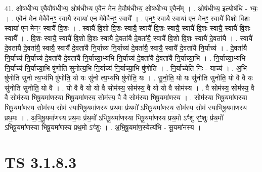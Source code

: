 \documentclass[17pt]{extarticle}
\begin{document}
41. ओष॑धीभ्य ए॒वैवौष॑धीभ्य॒ ओष॑धीभ्य ए॒वैन॑ मेन मे॒वौष॑धीभ्य॒ ओष॑धीभ्य ए॒वैन᳚म् । . ओष॑धीभ्य॒ इत्योष॑धि - भ्यः॒ । . ए॒वैन॑ मेन मे॒वैवैनꣳ॒॒ स्वायै॒ स्वाया॑ एन मे॒वैवैनꣳ॒॒ स्वायै᳚ । . ए॒नꣳ॒॒ स्वायै॒ स्वाया॑ एन मेनꣳ॒॒ स्वायै॑ वि॒शो वि॒शः स्वाया॑ एन मेनꣳ॒॒ स्वायै॑ वि॒शः । . स्वायै॑ वि॒शो वि॒शः स्वायै॒ स्वायै॑ वि॒शः स्वायै॒ स्वायै॑ वि॒शः स्वायै॒ स्वायै॑ वि॒शः स्वायै᳚ । . वि॒शः स्वायै॒ स्वायै॑ वि॒शो वि॒शः स्वायै॑ दे॒वता॑यै दे॒वता॑यै॒ स्वायै॑ वि॒शो वि॒शः स्वायै॑ दे॒वता॑यै । . स्वायै॑ दे॒वता॑यै दे॒वता॑यै॒ स्वायै॒ स्वायै॑ दे॒वता॑यै नि॒र्याच्य॑ नि॒र्याच्य॑ दे॒वता॑यै॒ स्वायै॒ स्वायै॑ दे॒वता॑यै नि॒र्याच्य॑ । . दे॒वता॑यै नि॒र्याच्य॑ नि॒र्याच्य॑ दे॒वता॑यै दे॒वता॑यै नि॒र्याच्या॒भ्य॑भि नि॒र्याच्य॑ दे॒वता॑यै दे॒वता॑यै नि॒र्याच्या॒भि । . नि॒र्याच्या॒भ्य॑भि नि॒र्याच्य॑ नि॒र्याच्या॒भि षु॑णोति सुनोत्य॒भि नि॒र्याच्य॑ नि॒र्याच्या॒भि षु॑णोति । . नि॒र्याच्येति॑ निः - याच्य॑ । . अ॒भि षु॑णोति सुनो त्य॒भ्य॑भि षु॑णोति॒ यो यः सु॑नो त्य॒भ्य॑भि षु॑णोति॒ यः । . सु॒नो॒ति॒ यो यः सु॑नोति सुनोति॒ यो वै वै यः सु॑नोति सुनोति॒ यो वै । . यो वै वै यो यो वै सोम॑स्य॒ सोम॑स्य॒ वै यो यो वै सोम॑स्य । . वै सोम॑स्य॒ सोम॑स्य॒ वै वै सोम॑स्या भिषू॒यमा॑णस्या भिषू॒यमा॑णस्य॒ सोम॑स्य॒ वै वै सोम॑स्या भिषू॒यमा॑णस्य । . सोम॑स्या भिषू॒यमा॑णस्या भिषू॒यमा॑णस्य॒ सोम॑स्य॒ सोम॑ स्याभिषू॒यमा॑णस्य प्रथ॒मः 
प्र॑थ॒मो॑ ऽभिषू॒यमा॑णस्य॒ सोम॑स्य॒ सोम॑ स्याभिषू॒यमा॑णस्य प्रथ॒मः । . अ॒भि॒षू॒यमा॑णस्य प्रथ॒मः प्र॑थ॒मो॑ ऽभिषू॒यमा॑णस्या भिषू॒यमा॑णस्य प्रथ॒मो ऽꣳ॑शु रꣳ॒॒शुः प्र॑थ॒मो॑ ऽभिषू॒यमा॑णस्या भिषू॒यमा॑णस्य प्रथ॒मो ऽꣳ॑शुः । . अ॒भि॒षू॒यमा॑ण॒स्येत्य॑भि - सू॒यमा॑नस्य । \newline
\pagebreak
{}

\section{ TS 3.1.8.3 }
\end{document}
